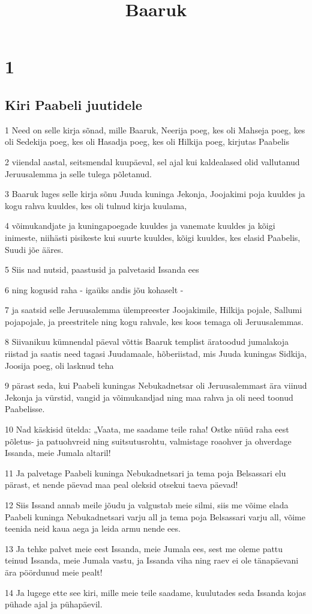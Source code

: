 

\title{Baaruk}

\chapter{1}

\section*{Kiri Paabeli juutidele}

\par 1 Need on selle kirja sõnad, mille Baaruk, Neerija poeg, kes oli Mahseja poeg, kes oli Sedekija poeg, kes oli Hasadja poeg, kes oli Hilkija poeg, kirjutas Paabelis
\par 2 viiendal aastal, seitsmendal kuupäeval, sel ajal kui kaldealased olid vallutanud Jeruusalemma ja selle tulega põletanud.
\par 3 Baaruk luges selle kirja sõnu Juuda kuninga Jekonja, Joojakimi poja kuuldes ja kogu rahva kuuldes, kes oli tulnud kirja kuulama,
\par 4 võimukandjate ja kuningapoegade kuuldes ja vanemate kuuldes ja kõigi inimeste, niihästi pisikeste kui suurte kuuldes, kõigi kuuldes, kes elasid Paabelis, Suudi jõe ääres.
\par 5 Siis nad nutsid, paastusid ja palvetasid Issanda ees
\par 6 ning kogusid raha - igaüks andis jõu kohaselt -
\par 7 ja saatsid selle Jeruusalemma ülempreester Joojakimile, Hilkija pojale, Sallumi pojapojale, ja preestritele ning kogu rahvale, kes koos temaga oli Jeruusalemmas.
\par 8 Siivanikuu kümnendal päeval võttis Baaruk templist äratoodud jumalakoja riistad ja saatis need tagasi Juudamaale, hõberiistad, mis Juuda kuningas Sidkija, Joosija poeg, oli lasknud teha
\par 9 pärast seda, kui Paabeli kuningas Nebukadnetsar oli Jeruusalemmast ära viinud Jekonja ja vürstid, vangid ja võimukandjad ning maa rahva ja oli need toonud Paabelisse.
\par 10 Nad käskisid ütelda: „Vaata, me saadame teile raha! Ostke nüüd raha eest põletus- ja patuohvreid ning suitsutusrohtu, valmistage roaohver ja ohverdage Issanda, meie Jumala altaril!
\par 11 Ja palvetage Paabeli kuninga Nebukadnetsari ja tema poja Belsassari elu pärast, et nende päevad maa peal oleksid otsekui taeva päevad!
\par 12 Siis Issand annab meile jõudu ja valgustab meie silmi, siis me võime elada Paabeli kuninga Nebukadnetsari varju all ja tema poja Belsassari varju all, võime teenida neid kaua aega ja leida armu nende ees.
\par 13 Ja tehke palvet meie eest Issanda, meie Jumala ees, sest me oleme pattu teinud Issanda, meie Jumala vastu, ja Issanda viha ning raev ei ole tänapäevani ära pöördunud meie pealt!
\par 14 Ja lugege ette see kiri, mille meie teile saadame, kuulutades seda Issanda kojas pühade ajal ja pühapäevil.

